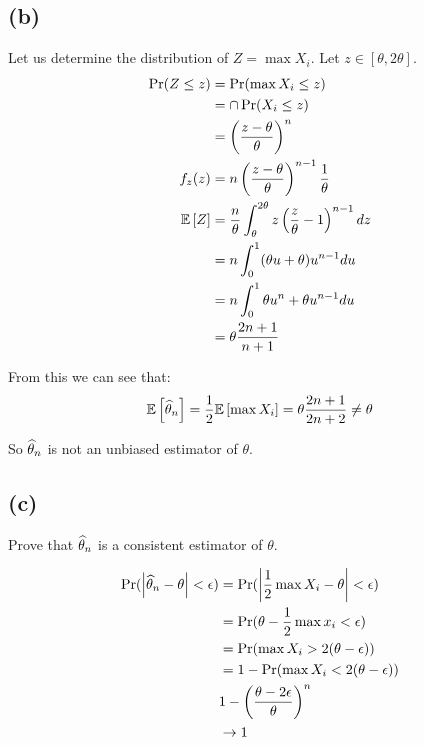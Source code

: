 \documentclass[12pt]{paper}
\begin{document}
\subsection{(b)}

Let us determine the distribution of $Z = \max X_i$.
Let $z \in [\theta,2\theta]$. 
\begin{align*}
  \Pr( Z \leq z ) &= \Pr( \max X_i \leq z)\\
               &= \cap \Pr( X_i \leq z)\\
               &= \left(  \frac{z - \theta}{\theta} \right)^n\\
  f_z(z) &= n \left( \frac{z-\theta}{\theta} \right)^{n-1} \frac{1}{\theta}\\
  \mathbb{E} \left [ Z \right ] &= \frac{n}{\theta}\int_{\theta}^{2\theta} z \left(  \frac{z}{\theta} - 1
            \right)^{n-1} dz\\
               &= n \int_0^1 (\theta u + \theta )u^{n-1}du\\
               &= n \int_0^1 \theta u^n + \theta u^{n-1}du\\
  &= \theta \frac{2n + 1}{n+1} 
\end{align*}

From this we can see that:
\begin{equation*}
  \mathbb{E} \left [  \widehat{ \theta }_{n} \right ] = \frac{1}{2} \mathbb{E} \left [  \max{X_i} \right ] = \theta \frac{2n+1}{2n+2}
  \neq \theta
\end{equation*}

So $\widehat{ \theta }_{n}$ is not an unbiased estimator of $\theta$.

\subsection{(c)}

Prove that $\widehat{ \theta }_{n}$ is a consistent estimator of $\theta$.

\begin{align*}
  \Pr( \left \lvert \widehat{ \theta }_{n} - \theta \right \rvert < \epsilon) &= \Pr( \left \lvert  \frac{1}{2}\max{X_i} - \theta \right \rvert
                                < \epsilon)\\
                              &= \Pr( \theta - \frac{1}{2} \max{x_i} < \epsilon)\\
                              &= \Pr( \max{X_i} > 2( \theta - \epsilon))\\
                              &= 1 - \Pr( \max{X_i} < 2( \theta - \epsilon))\\
                              &1 - \left(  \frac{\theta - 2 \epsilon}{\theta}\right)^n\\
  &\rightarrow 1
\end{align*}
\end{document}
